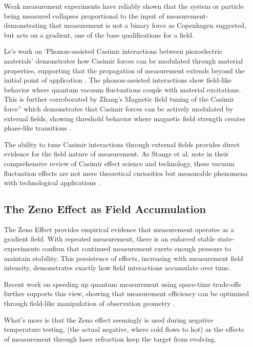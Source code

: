 Weak measurement experiments have reliably shown that the system or particle being measured collapses proportional to the input of measurement-demonstrating that measurement is not a binary force as Copenhagen suggested, but acts on a gradient, one of the base qualifications for a field.

Le's work on `Phonon-assisted Casimir interactions between piezoelectric materials' demonstrates how Casimir forces can be modulated through material properties, supporting that the propagation of measurement extends beyond the initial point of application \cite{le_phonon-assisted_2024}. The phonon-assisted interactions show field-like behavior where quantum vacuum fluctuations couple with material excitations. This is further corroborated by Zhang's Magnetic field tuning of the Casimir force'' which demonstrates that Casimir forces can be actively modulated by external fields, showing threshold behavior where magnetic field strength creates phase-like transitions \cite{zhang2024}.

The ability to tune Casimir interactions through external fields provides direct evidence for the field nature of measurement. As Stange et al. note in their comprehensive review of Casimir effect science and technology, these vacuum fluctuation effects are not mere theoretical curiosities but measurable phenomena with technological applications \cite{stange_science_2021}.

\subsection{The Zeno Effect as Field Accumulation}

The Zeno Effect provides empirical evidence that measurement operates as a gradient field. With repeated measurement, there is an enforced stable state-experiments confirm that continued measurement exerts enough pressure to maintain stability. This persistence of effects, increasing with measurement field intensity, demonstrates exactly how field interactions accumulate over time.

Recent work on speeding up quantum measurement using space-time trade-offs further supports this view, showing that measurement efficiency can be optimized through field-like manipulation of observation geometry \cite{corlett_speeding_2025}.

What's more is that the Zeno effect seemingly is used during negative temperature testing, (the actual negative, where cold flows to hot) as the effects of measurement through laser refraction keep the target from evolving. \cite{yang2025, braund_negative_2024, lander_gower_exploring_2024}

